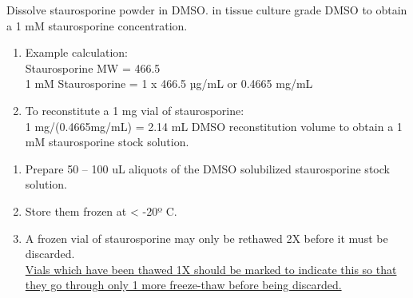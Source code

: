 \documentclass[10pt,letterpaper]{protocol}
\begin{document}
\clearpage




    


Dissolve staurosporine powder in DMSO. in tissue culture grade DMSO to obtain a 1 mM staurosporine concentration.
\begin{enumerate}[label=(\alph*)]
	\item Example calculation: \\
	Staurosporine MW = 466.5 \\
	1 mM Staurosporine = 1 x 466.5 µg/mL or 0.4665 mg/mL
	\item To reconstitute a 1 mg vial of staurosporine:  \\
	1 mg/(0.4665mg/mL)  =  2.14 mL DMSO reconstitution volume to obtain a 1 mM staurosporine stock solution.
\end{enumerate}

\divider

\begin{enumerate}[label=(\alph*)]
	\item Prepare 50 – 100 uL aliquots of the DMSO solubilized staurosporine stock solution.
	\item Store them frozen at < -20º C.
	\item A frozen vial of staurosporine may only be rethawed 2X before it must be discarded.\\
	\uline{Vials which have been thawed 1X should be marked to indicate this so that they go through only 1 more freeze-thaw before being discarded.}
\end{enumerate}
\end{document}
